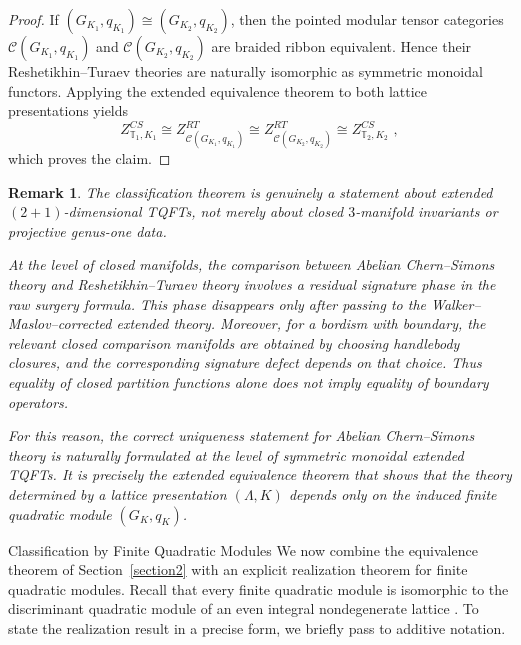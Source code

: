 \documentclass[12pt]{amsart}
\makeatletter
\renewcommand\section{\@startsection{section}{1}%
  \z@{.7\linespacing\@plus\linespacing}{.5\linespacing}%
  {\normalfont\bfseries\centering}}
\numberwithin{equation}{section}
\newtheorem*{remark}{Remark}
\makeatother
\begin{document}
\begin{proof}
If $(G_{K_1},q_{K_1})\cong (G_{K_2},q_{K_2})$, then the pointed modular tensor
categories $\mathcal C(G_{K_1},q_{K_1})$ and $
\mathcal C(G_{K_2},q_{K_2})$ are braided ribbon equivalent. Hence their  Reshetikhin--Turaev theories are naturally isomorphic as symmetric monoidal
functors. Applying the extended equivalence theorem to both lattice
presentations yields
\[
Z^{CS}_{\mathbb T_1,K_1}\cong Z^{RT}_{\mathcal C(G_{K_1},q_{K_1})}
\cong Z^{RT}_{\mathcal C(G_{K_2},q_{K_2})}
\cong Z^{CS}_{\mathbb T_2,K_2}\,\,,
\]
which proves the claim.
\end{proof}

\begin{remark}The classification theorem is genuinely a statement about extended
$(2+1)$-dimensional TQFTs, not merely about closed $3$-manifold invariants or
projective genus-one data.

At the level of closed manifolds, the comparison between Abelian Chern--Simons theory and  Reshetikhin--Turaev theory involves a residual signature phase in the raw surgery formula. This phase disappears only after passing to the Walker--Maslov--corrected extended theory. Moreover, for a bordism with boundary, the relevant closed comparison manifolds are obtained by choosing handlebody closures, and the corresponding signature defect depends on that choice. Thus equality of closed partition functions alone does not imply equality of boundary operators.

For this reason, the correct uniqueness statement for  Abelian
Chern--Simons theory is naturally formulated at the level of symmetric monoidal
extended TQFTs. It is precisely the extended equivalence theorem that shows that
the theory determined by a lattice presentation $(\Lambda,K)$ depends only on
the induced finite quadratic module $(G_K,q_K)$.
\end{remark}
\section{Classification by Finite Quadratic Modules}
We now combine the equivalence theorem of Section~\ref{section2} with an explicit realization theorem for finite quadratic modules.  Recall that every finite quadratic module is isomorphic to the discriminant quadratic module of an even integral nondegenerate lattice \cite[Theorem 6]{Wall1963}. To state the realization result in a precise form,
we briefly pass to additive notation.
\end{document}
